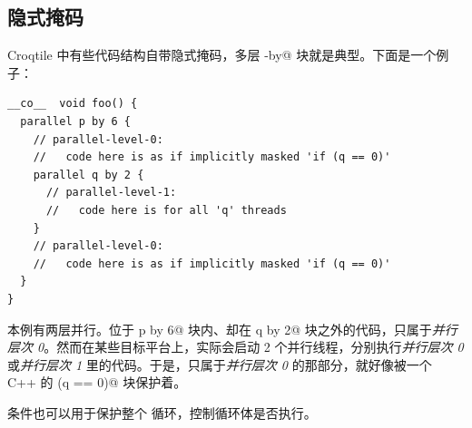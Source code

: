 \subsection*{隐式掩码}

Croqtile 中有些代码结构自带隐式掩码，多层 \co@parallel-by@ 块就是典型。下面是一个例子：

\begin{lstlisting}[language=croqtile,caption={隐式掩码}]
__co__  void foo() {
  parallel p by 6 {
    // parallel-level-0:
    //   code here is as if implicitly masked 'if (q == 0)'
    parallel q by 2 {
      // parallel-level-1:
      //   code here is for all 'q' threads
    }
    // parallel-level-0:
    //   code here is as if implicitly masked 'if (q == 0)'
  }
}
\end{lstlisting}

本例有两层并行。位于 \co@parallel p by 6@ 块内、却在 \co@parallel q by 2@ 块之外的代码，只属于\emph{并行层次 0}。然而在某些目标平台上，实际会启动 2 个并行线程，分别执行\emph{并行层次 0} 或\emph{并行层次 1} 里的代码。于是，只属于\emph{并行层次 0} 的那部分，就好像被一个 C++ 的 \co@if (q == 0)@ 块保护着。

条件也可以用于保护整个 \co@foreach@ 循环，控制循环体是否执行。

